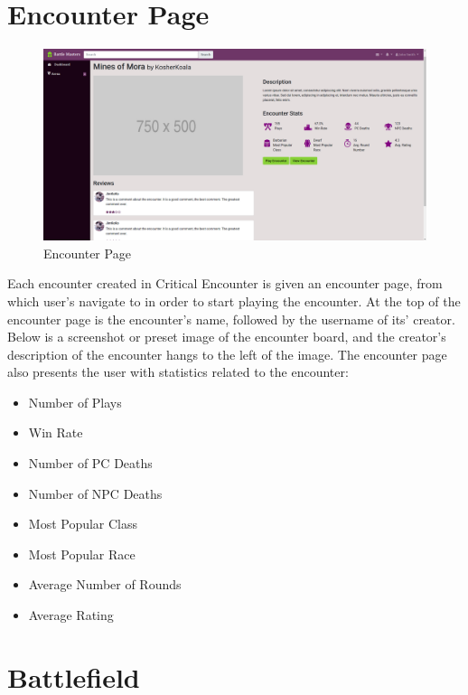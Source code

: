 \documentclass[12pt,a4paper]{report}
\begin{document}
	\section{Encounter Page}
	\begin{figure}[H]
		\centering
		\includegraphics[scale=.20]{encounter}
		\caption{Encounter Page}
		\label{fig: Encounter Page}
	\end{figure}
	Each encounter created in Critical Encounter is given an encounter page, from which user's navigate to in order to start playing the encounter. At the top of the encounter page is the encounter's name, followed by the username of its' creator. Below is a screenshot or preset image of the encounter board, and the creator's description of the encounter hangs to the left of the image. The encounter page also presents the user with statistics related to the encounter:
	\begin{multicols}{2}
		\begin{itemize}
			\item Number of Plays
			\item Win Rate
			\item Number of PC Deaths
			\item Number of NPC Deaths
			\item Most Popular Class
			\item Most Popular Race
			\item Average Number of Rounds
			\item Average Rating
		\end{itemize}
	\end{multicols}
	\newpage
	\section{Battlefield}
	\lipsum[3]
	\newpage
\end{document}
